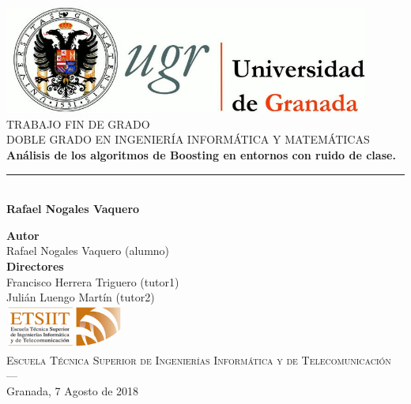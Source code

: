 \begin{titlepage}
 
 
\newlength{\centeroffset}
\setlength{\centeroffset}{-0.5\oddsidemargin}
\addtolength{\centeroffset}{0.5\evensidemargin}
\thispagestyle{empty}

\noindent\hspace*{\centeroffset}\begin{minipage}{\textwidth}

\centering
\includegraphics[width=0.9\textwidth]{imagenes/logo_ugr.jpg}\\[1.4cm]

\textsc{ \Large TRABAJO FIN DE GRADO\\[0.2cm]}
\textsc{ DOBLE GRADO EN INGENIERÍA INFORMÁTICA Y MATEMÁTICAS }\\[1cm]
% 
{\Huge\bfseries Análisis de los algoritmos de Boosting en entornos con ruido de clase.\\
}
\noindent\rule[-1ex]{\textwidth}{3pt}\\[3.5ex]
{\large\bfseries Rafael Nogales Vaquero}
\end{minipage}

\vspace{2.5cm}
\noindent\hspace*{\centeroffset}\begin{minipage}{\textwidth}
\centering

\textbf{Autor}\\ {Rafael Nogales Vaquero (alumno)}\\[2.5ex]
\textbf{Directores}\\
{Francisco Herrera Triguero (tutor1)\\
Julián Luengo Martín (tutor2)}\\[2cm]
\includegraphics[width=0.3\textwidth]{imagenes/etsiit_logo.png}\\[0.1cm]
\textsc{Escuela Técnica Superior de Ingenierías Informática y de Telecomunicación}\\
\textsc{---}\\
Granada, 7 Agosto de 2018
\end{minipage}
\end{titlepage}


